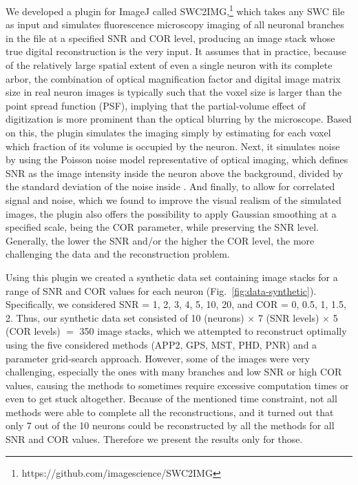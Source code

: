 We developed a plugin for ImageJ \cite{schneider2012} called SWC2IMG,\footnote{https://github.com/imagescience/SWC2IMG} which takes any SWC file as input and simulates fluorescence microscopy imaging of all neuronal branches in the file at a specified SNR and COR level, producing an image stack whose true digital reconstruction is the very input. It assumes that in practice, because of the relatively large spatial extent of even a single neuron with its complete arbor, the combination of optical magnification factor and digital image matrix size in real neuron images is typically such that the voxel size is larger than the point spread function (PSF), implying that the partial-volume effect of digitization is more prominent than the optical blurring by the microscope. Based on this, the plugin simulates the imaging simply by estimating for each voxel which fraction of its volume is occupied by the neuron. Next, it simulates noise by using the Poisson noise model representative of optical imaging, which defines SNR as the image intensity inside the neuron above the background, divided by the standard deviation of the noise inside \cite{sheppard2006}. And finally, to allow for correlated signal and noise, which we found to improve the visual realism of the simulated images, the plugin also offers the possibility to apply Gaussian smoothing at a specified scale, being the COR parameter, while preserving the SNR level. Generally, the lower the SNR and/or the higher the COR level, the more challenging the data and the reconstruction problem.

Using this plugin we created a synthetic data set containing image stacks for a range of SNR and COR values for each neuron (Fig.~\ref{fig:data-synthetic}). Specifically, we considered SNR = 1, 2, 3, 4, 5, 10, 20, and COR = 0, 0.5, 1, 1.5, 2. Thus, our synthetic data set consisted of 10 (neurons) $\times$ 7 (SNR levels) $\times$ 5 (COR levels) $=$ 350 image stacks, which we attempted to reconstruct optimally using the five considered methods (APP2, GPS, MST, PHD, PNR) and a parameter grid-search approach. However, some of the images were very challenging, especially the ones with many branches and low SNR or high COR values, causing the methods to sometimes require excessive computation times or even to get stuck altogether. Because of the mentioned time constraint, not all methods were able to complete all the reconstructions, and it turned out that only 7 out of the 10 neurons could be reconstructed by all the methods for all SNR and COR values. Therefore we present the results only for those.


